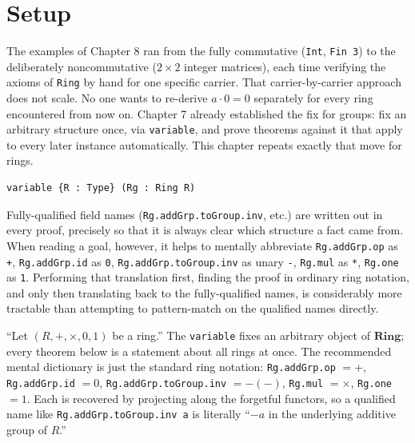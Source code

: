 \section{Setup}\label{sec:09-ring-theorems:01-setup:1}

The examples of Chapter 8 ran from the fully commutative (\texttt{Int}, \texttt{Fin 3}) to the deliberately noncommutative (\(2\times 2\) integer matrices), each time verifying the axioms of \texttt{Ring} by hand for one specific carrier. That carrier-by-carrier approach does not scale. No one wants to re-derive \(a\cdot 0=0\) separately for every ring encountered from now on. Chapter 7 already established the fix for groups: fix an arbitrary structure once, via \texttt{variable}, and prove theorems against it that apply to every later instance automatically. This chapter repeats exactly that move for rings.

\begin{lstlisting}
variable {R : Type} (Rg : Ring R)
\end{lstlisting}

Fully-qualified field names (\texttt{Rg.addGrp.toGroup.inv}, etc.) are written out in every proof, precisely so that it is always clear which structure a fact came from. When reading a goal, however, it helps to mentally abbreviate \texttt{Rg.addGrp.op} as \texttt{+}, \texttt{Rg.addGrp.id} as \texttt{0}, \texttt{Rg.addGrp.toGroup.inv} as unary \texttt{-\allowbreak{}}, \texttt{Rg.mul} as \texttt{*}, \texttt{Rg.one} as \texttt{1}. Performing that translation first, finding the proof in ordinary ring notation, and only then translating back to the fully-qualified names, is considerably more tractable than attempting to pattern-match on the qualified names directly.

\begin{mathreading}

``Let \((R, +, \times, 0, 1)\) be a ring.'' The \texttt{variable} fixes an arbitrary object of \(\mathbf{Ring}\); every theorem below is a statement about all rings at once. The recommended mental dictionary is just the standard ring notation: \texttt{Rg.addGrp.op} \(= +\), \texttt{Rg.addGrp.id} \(= 0\), \texttt{Rg.addGrp.toGroup.inv} \(= -(-)\), \texttt{Rg.mul} \(= \times\), \texttt{Rg.one} \(= 1\). Each is recovered by projecting along the forgetful functors, so a qualified name like \texttt{Rg.addGrp.toGroup.inv a} is literally ``\(-a\) in the underlying additive group of \(R\).''

\end{mathreading}

